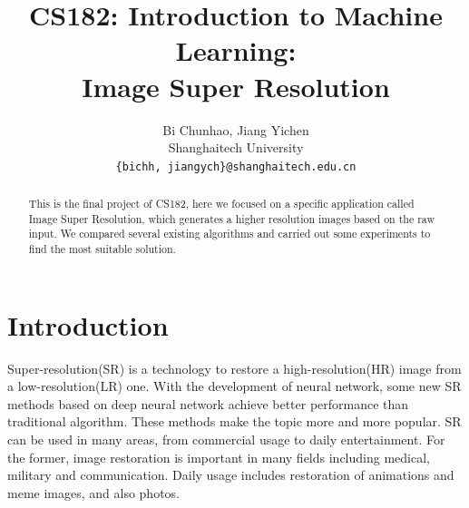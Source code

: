 \documentclass[10pt,twocolumn,letterpaper]{article}
\begin{document}
\title{CS182: Introduction to Machine Learning: \\ Image Super Resolution}

\author{Bi Chunhao, Jiang Yichen\\
Shanghaitech University\\
 {\tt\small \{bichh, jiangych\}@shanghaitech.edu.cn}
}

\maketitle

\begin{abstract}
This is the final project of CS182, here we focused on a specific application called Image Super Resolution,
which generates a higher resolution images based on the raw input. 
We compared several existing algorithms and carried out some experiments to find the most suitable solution.
\end{abstract}

\section{Introduction}
Super-resolution(SR) is a technology to restore a high-resolution(HR) image from a low-resolution(LR) one. 
With the development of neural network, some new SR methods based on deep neural network achieve better performance than traditional algorithm. 
These methods make the topic more and more popular. SR can be used in many areas, from commercial usage to daily entertainment. 
For the former, image restoration is important in many fields including medical, military and communication. 
Daily usage includes restoration of animations and meme images, and also photos.
\end{document}
